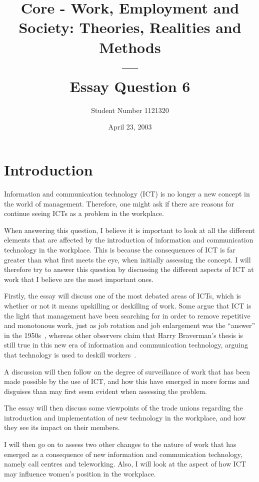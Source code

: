 \documentclass[a4paper,12pt,titlepage]{article}
\title{Core - Work, Employment and Society: Theories, Realities and Methods \\ --- \\Essay Question 6}
\author{Student Number 1121320}
\date{April 23, 2003}
\begin{document}
  \setlength{\baselineskip}{2em}
  \maketitle
  
  \section{Introduction}
  Information and communication technology (ICT) is no longer
  a new concept in the world of management. Therefore, one
  might ask if there are reasons for continue seeing
  ICTs as a problem in the workplace.

  When answering this question,
  I believe it is important to look at all the different elements that
  are affected by the introduction of information and
  communication technology in the workplace. This is because the consequences of ICT
  is far greater than what first meets the eye, when initially assessing
  the concept. I will therefore try to answer this question
  by discussing the different aspects of ICT at work that I believe are the
  most important ones.

  Firstly, the essay will discuss one of the most debated areas of ICTs, which
  is whether or not it means upskilling or deskilling of work.
  Some argue that ICT is the light that management
  have been searching for in order to remove repetitive and
  monotonous work, just as job rotation and job enlargement was the
  ``answer'' in the 1950s~\cite[79]{ahdb},
  whereas other observers claim that Harry Braverman's thesis is still
  true in this new era of information and communication technology,
  arguing that technology is used to
  deskill workers~\cite[119]{vz}.

  A discussion will then follow on the degree of surveillance of work
  that has been made possible by the use of ICT,
  and how this have emerged in more forms and disguises than may first seem evident when
  assessing the problem.

  The essay will then discuss some viewpoints of the trade unions
  regarding the introduction and implementation of new technology in the
  workplace, and how they see its impact on their members.

  I will then go on to assess two other changes
  to the nature of work that has emerged as a consequence of new information and
  communication technology, namely call centres and teleworking.
  Also, I will look at the aspect of how ICT may influence women's
  position in the workplace.
\end{document}
